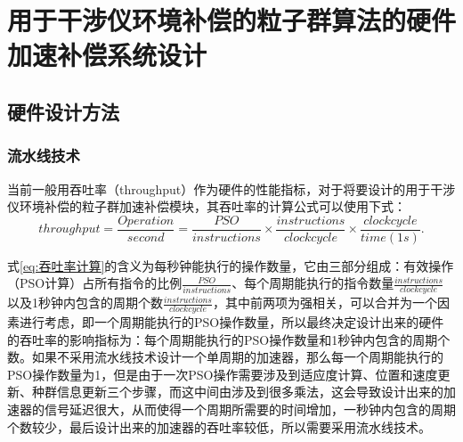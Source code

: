 \chapter{用于干涉仪环境补偿的粒子群算法的硬件加速补偿系统设计}
\section{硬件设计方法}
\subsection{流水线技术}
\label{流水线技术}
当前一般用吞吐率（throughput）作为硬件的性能指标，对于将要设计的用于干涉仪环境补偿的粒子群加速补偿模块，其吞吐率的计算公式可以使用下式：
\begin{equation}\label{eq:吞吐率计算}
    throughput = \frac{Operation}{second}=\frac{PSO}{instructions}\times \frac{instructions}{clock cycle} \times \frac{clock cycle}{time(1s)}.
    \end{equation}

式\eqref{eq:吞吐率计算}的含义为每秒钟能执行的操作数量，它由三部分组成：有效操作（PSO计算）占所有指令的比例$\frac{PSO}{instructions}$、每个周期能执行的指令数量$\frac{instructions}{clock cycle}$以及1秒钟内包含的周期个数$\frac{instructions}{clock cycle}$，其中前两项为强相关，可以合并为一个因素进行考虑，即一个周期能执行的PSO操作数量，所以最终决定设计出来的硬件的吞吐率的影响指标为：每个周期能执行的PSO操作数量和1秒钟内包含的周期个数。如果不采用流水线技术设计一个单周期的加速器，那么每一个周期能执行的PSO操作数量为1，但是由于一次PSO操作需要涉及到适应度计算、位置和速度更新、种群信息更新三个步骤，而这中间由涉及到很多乘法，这会导致设计出来的加速器的信号延迟很大，从而使得一个周期所需要的时间增加，一秒钟内包含的周期个数较少，最后设计出来的加速器的吞吐率较低，所以需要采用流水线技术。

